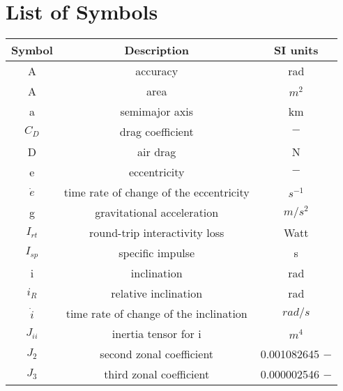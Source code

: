 \documentclass{report}
\begin{document}
\chapter{List of Symbols}
\label{SymbList}

\begin{table}
\centering
\begin{tabular}{c|c|c}

{\bf Symbol} & {\bf Description} & {\bf SI units} \\
\hline
         A &   accuracy &        rad \\

         A &       area &         $m^2$ \\

         a & semimajor axis &         km \\

        $C_D$ & drag coefficient &          $-$ \\

         D &   air drag &          N \\

         e & eccentricity &          $-$ \\

   $\dot e$ & time rate of change of the eccentricity &        $s^{-1}$ \\

         g & gravitational acceleration &       $m/s^2$ \\

       $I_{rt}$ & round-trip interactivity loss &       Watt \\

       $I_{sp}$ & specific impulse &          s \\

         i & inclination &        rad \\

        $i_R$ & relative inclination &        rad \\

   $\dot i$ & time rate of change of the inclination &      $rad/s$ \\

       $J_{ii}$ & inertia tensor for i &         $m^4$ \\

        $J_2$ & second zonal coefficient & 0.001082645 $-$ \\

        $J_3$ & third zonal coefficient & 0.000002546 $-$ \\


\end{tabular}
\end{table}
\end{document}
